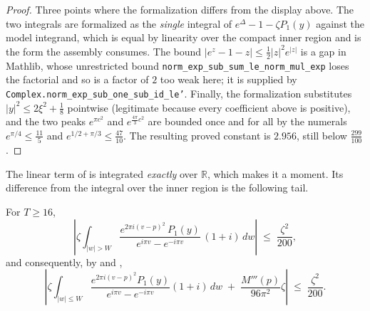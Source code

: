 \begin{proof}
Three points where the formalization differs from the display above.  The
two integrals are formalized as the \emph{single} integral of $e^{\Delta}-1-\zeta P_{1}(y)$
against the model integrand, which is equal by linearity over the compact inner region and is the
form the assembly consumes.  The bound $\lvert e^{z}-1-z\rvert\le\tfrac12\lvert
z\rvert^{2}e^{\lvert z\rvert}$ is a gap in Mathlib, whose unrestricted bound
\texttt{norm\_exp\_sub\_sum\_le\_norm\_mul\_exp} loses the factorial and so is a factor of
$2$ too weak here; it is supplied by \texttt{Complex.norm\_exp\_sub\_one\_sub\_id\_le'}.
Finally, the formalization substitutes $\lvert y\rvert^{2}\le2\xi^{2}+\tfrac18$ pointwise
(legitimate because every coefficient above is positive), and the two peaks $e^{\pi c^{2}}$ and $e^{\frac{4\pi}3c^{2}}$
are bounded once and for all by the numerals $e^{\pi/4}\le\tfrac{11}5$ and
$e^{1/2+\pi/3}\le\tfrac{47}{10}$.  The resulting proved constant is $2.956$, still below
$\tfrac{299}{100}$.
\end{proof}

The linear term of  is integrated \emph{exactly} over
$\mathbb{R}$, which makes it a moment.  Its difference from the integral over the inner region
is the following tail.

\begin{lemma}
\label{lem:rsf_linear_tail}
\leanok
{}
For $T\ge16$,
\[
  \left\lvert\zeta\int_{\lvert w\rvert>W}
    \frac{e^{2\pi i(v-p)^{2}}\,P_{1}(y)}{e^{i\pi v}-e^{-i\pi v}}\,(1+i)\,dw\right\rvert
  \;\le\;\frac{\zeta^{2}}{200},
\]
and consequently, by  and ,
\[
  \left\lvert\zeta\int_{\lvert w\rvert\le W}
    \frac{e^{2\pi i(v-p)^{2}}P_{1}(y)}{e^{i\pi v}-e^{-i\pi v}}(1+i)\,dw
    \;+\;\frac{M'''(p)}{96\pi^{2}}\zeta\right\rvert\;\le\;\frac{\zeta^{2}}{200}.
\]
\end{lemma}

